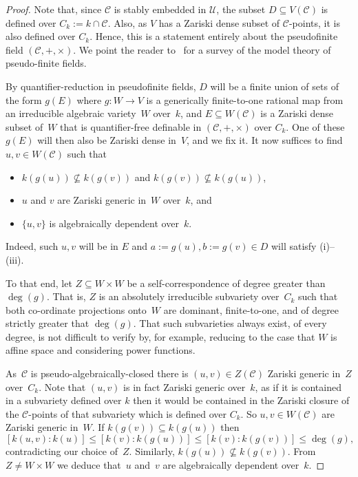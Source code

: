\documentclass[\DocOpts]{amsart}
\theoremstyle{definition}
\def\C{\mathcal{C}}
\def\U{\mathcal{U}}
\newcommand{\kk}{k}
\newcommand{\Set}[1]{\{#1\}}
\newcommand{\<}{\langle}
\renewcommand{\>}{\rangle}
\begin{document}
\begin{proof}
	Note that, since \(\C\) is stably embedded in \(\U\), the subset \(D\subseteq V(\C)\) is defined over \(C_\kk:=k\cap\C\).
	Also, as $V$ has a Zariski dense subset of $\C$-points, it is also defined over $C_k$.
	Hence, this is a statement entirely about the pseudofinite 
	field \((\C,+,\times)\).
	We point the reader to~\cite{zoe-psf} for a survey 
	of the model theory of pseudo-finite fields.
	
	By quantifier-reduction in pseudofinite fields, \(D\) will be a finite 
	union of sets of the form \(g(E)\) where \(g:W\to{}V\) is a generically 
	finite-to-one rational map from an irreducible algebraic 
	variety~\(W\) over~$k$, and \(E\subseteq W(\C)\) is a Zariski dense subset of~$W$ that is
	quantifier-free definable in \((\C,+,\times)\) over \(C_k\).
	One of these \(g(E)\) will then also be Zariski dense in~\(V\), and we fix 
	it.
	It now suffices to find \(u,v\in{}W(\C)\) such that
\begin{itemize}
\item $k(g(u))\not\subseteq k(g(v))$ and $k(g(v))\not\subseteq k(g(u))$,
 \item
 $u$ and $v$ are Zariski generic in~\(W\) over~\(\kk\), and
 \item
 \(\Set{u,v}\) is algebraically dependent over~\(\kk\).
 \end{itemize}
	Indeed, such \(u,v\) will be in \(E\) and $a:=g(u), b:=g(v)\in D$ will satisfy (i)--(iii).
	
	To that end, let \(Z\subseteq W\times W\) be a self-correspondence of degree greater than $\deg(g)$.
	That is, $Z$ is an absolutely irreducible subvariety over~\(C_\kk\) such that both co-ordinate projections 
	onto~\(W\) are dominant, finite-to-one, and of degree strictly greater that \(\deg(g)\).
	That such 
	subvarieties always exist, of every degree, is not difficult to verify by, 
	for example, reducing to the case that \(W\) is affine space and considering power functions.

As~\(\C\) is pseudo-algebraically-closed there is \((u,v)\in{}Z(\C)\) Zariski generic in~$Z$ over~$C_k$.
Note that $(u,v)$ is in fact Zariski generic over~$k$, as if it is contained in a subvariety defined over $k$ then it would be contained in the Zariski closure of the $\C$-points of that subvariety which is defined over $C_k$.
So $u,v\in W(\C)$ are Zariski generic in~$W$.
If $k(g(v))\subseteq k(g(u))$ then
	$$[k(u,v):k(u)]\leq [k(v):k(g(u))]\leq[k(v):k(g(v))]\leq\deg(g),$$
contradicting our choice of~$Z$.
	Similarly, $k(g(u))\not\subseteq k(g(v))$.
	From $Z\neq W\times W$ we deduce that~$u$ and~$v$ are algebraically dependent over~$k$.
\end{proof}
\end{document}
